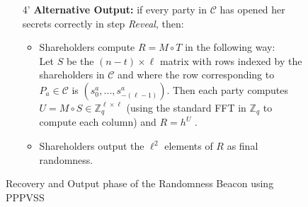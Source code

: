 \begin{figure}[ht]
\begin{tcolorbox}[title=\textbf{Randomness Beacon using PPPVSS (cont.)}, width=0.9\textwidth, colframe=blue!75!black, colback=blue!10, sharp corners]
\begin{enumerate}
            \item [4']\textbf{Alternative Output:}  if every party in $\mathcal{C}$ has opened her secrets correctly in step \textit{Reveal}, then:
            \begin{itemize}
                \item Shareholders compute $R = M \circ T$ in the following way:\\
                    Let $S$ be the $(n - t) \times \ell$ matrix with rows indexed by the shareholders in $\mathcal{C}$ and where the row
                    corresponding to $P_a \in\mathcal{C}$ is $(s_0^a,...,s_{-(\ell-1)}^a )$. Then each party computes $U = M \circ S \in\mathbb{Z}_q^{\ell\times \ell}$ (using the standard FFT in $\mathbb{Z}_q$ to compute each column) and $R = h^U$ .
                \item Shareholders output the $\ell^2$ elements of $R$ as final randomness.
            \end{itemize}
        \end{enumerate}
    \end{tcolorbox}
    \caption{Recovery and Output phase of the Randomness Beacon using PPPVSS}
    \label{fig:randomness_beacon_cont}
\end{figure}